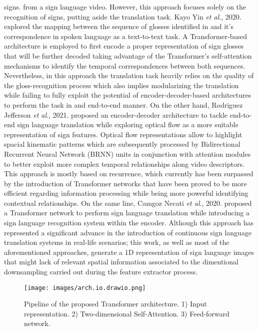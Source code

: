 {signs.} from a sign language video. However, this approach focuses solely on the recognition of signs, putting aside the translation task. Kayo Yin \textit{et al}., 2020. \cite{yin2020better} explored the mapping between the sequence of glosses identified in \cite{9354538} and it's correspondence in spoken language as a text-to-text task. A Transformer-based architecture \cite{vaswani2017attention} is employed to first encode a proper representation of sign glosses that will be further decoded taking advantage of the Transformer's self-attention mechanisms to identify the temporal correspondences between both sequences. Nevertheless, in this approach the translation task heavily relies on the quality of the gloss-recognition process which also implies modularizing the translation while failing to fully exploit the potential of encoder-decoder-based architectures to perform the task in and end-to-end manner. On the other hand, Rodriguez Jefferson \textit{et al}., 2021. \cite{https://doi.org/10.1049/cvi2.12037} proposed an encoder-decoder architecture to tackle end-to-end sign language translation while exploring optical flow as a more suitable representation of sign features. Optical flow representations allow to highlight spacial kinematic patterns which are subsequently processed by Bidirectional Recurrent Neural Network (BRNN) units in conjunction with attention modules to better exploit more complex temporal relationships along video descriptors. This approach is mostly based on recurrence, which currently has been surpassed by the introduction of Transformer networks that have been proved to be more efficient regarding information processing while being more powerful identifying contextual relationships. On the same line, Camgoz Necati \textit{et al}., 2020. \cite{camgoz2020sign} proposed a Transformer network to perform sign language translation while introducing a sign language recognition system within the encoder. Although this approach has represented a significant advance in the introduction of continuous sign language translation systems in real-life scenarios; this work, as well as most of the aforementioned approaches, generate a 1D representation of sign language images that might lack of relevant spatial information associated to the dimentional downsampling carried out during the feature extractor process.\\


\begin{figure*}[ht!]
\centering
\texttt{[image: images/arch.io.drawio.png]}
\label{Fig:pipeline}
\caption{Pipeline of the proposed Transformer architecture. 1) Input representation. 2) Two-dimensional Self-Attention. 3) Feed-forward network.}
\end{figure*}